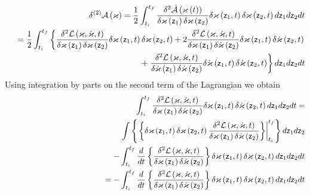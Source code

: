 \begin{eqnarray}
&&\delta ^{\left( 2\right) }{\cal A}\left( \varkappa \right) =\frac{1}{2}%
\int_{t_{i}}^{t_{f}}\frac{\delta ^{2}{\cal \dot{A}}\left( \varkappa \left(
t\right) \right) }{\delta \varkappa \left( {\sf z}_{1}\right) \delta
\varkappa \left( {\sf z}_{2}\right) }\delta \varkappa \left( {\sf z}%
_{1},t\right) \delta \varkappa \left( {\sf z}_{2},t\right) d{\sf z}_{1}d{\sf %
z}_{2}dt  \nonumber \\
&&\left. {}\right. =\frac{1}{2}\int_{t_{i}}^{t_{f}}\left\{ \frac{\delta ^{2}%
{\cal L}\left( {\cal \varkappa },{\cal \dot{\varkappa}},t\right) }{\delta
\varkappa \left( {\sf z}_{1}\right) \delta \varkappa \left( {\sf z}%
_{2}\right) }\delta \varkappa \left( {\sf z}_{1},t\right) \delta \varkappa
\left( {\sf z}_{2},t\right) +2\frac{\delta ^{2}{\cal L}\left( {\cal %
\varkappa },{\cal \dot{\varkappa}},t\right) }{\delta \varkappa \left( {\sf z}%
_{1}\right) \delta \dot{\varkappa}\left( {\sf z}_{2}\right) }\delta
\varkappa \left( {\sf z}_{1},t\right) \delta \dot{\varkappa}\left( {\sf z}%
_{2},t\right) \right.  \nonumber \\
&&\qquad \qquad \qquad \qquad \qquad \qquad \qquad +\left. \frac{\delta ^{2}%
{\cal L}\left( {\cal \varkappa },{\cal \dot{\varkappa}},t\right) }{\delta 
\dot{\varkappa}\left( {\sf z}_{1}\right) \delta \dot{\varkappa}\left( {\sf z}%
_{2}\right) }\delta \dot{\varkappa}\left( {\sf z}_{1},t\right) \delta \dot{%
\varkappa}\left( {\sf z}_{2},t\right) \right\} d{\sf z}_{1}d{\sf z}_{2}dt
\label{Avar2}
\end{eqnarray}%
Using integration by parts on the second term of the Lagrangian we obtain 
\begin{eqnarray}
&&\int_{t_{i}}^{t_{f}}\frac{\delta ^{2}{\cal L}\left( {\cal \varkappa },%
{\cal \dot{\varkappa}},t\right) }{\delta \varkappa \left( {\sf z}_{1}\right)
\delta \dot{\varkappa}\left( {\sf z}_{2}\right) }\delta \varkappa \left( 
{\sf z}_{1},t\right) \delta \dot{\varkappa}\left( {\sf z}_{2},t\right) d{\sf %
z}_{1}d{\sf z}_{2}dt=  \nonumber \\
&&\int \left\{ \left. \left\{ \delta \varkappa \left( {\sf z}_{1},t\right)
\delta \varkappa \left( {\sf z}_{2},t\right) \frac{\delta ^{2}{\cal L}\left(
\varkappa ,\dot{\varkappa},t\right) }{\delta \varkappa \left( {\sf z}%
_{1}\right) \delta \dot{\varkappa}\left( {\sf z}_{2}\right) }\right\}
\right| _{t_{i}}^{t_{f}}\right\} d{\sf z}_{1}d{\sf z}_{2}  \nonumber \\
&&\qquad \qquad \qquad \qquad \qquad -\int_{t_{i}}^{t_{f}}\frac{d}{dt}%
\left\{ \frac{\delta ^{2}{\cal L}\left( \varkappa ,\dot{\varkappa},t\right) 
}{\delta \varkappa \left( {\sf z}_{1}\right) \delta \dot{\varkappa}\left( 
{\sf z}_{2}\right) }\right\} \delta \varkappa \left( {\sf z}_{1},t\right)
\delta \varkappa \left( {\sf z}_{2},t\right) d{\sf z}_{1}d{\sf z}_{2}dt 
\nonumber \\
&&\left. {}\right. \qquad \qquad \qquad \qquad \qquad \quad
=-\int_{t_{i}}^{t_{f}}\frac{d}{dt}\left\{ \frac{\delta ^{2}{\cal L}\left(
\varkappa ,\dot{\varkappa},t\right) }{\delta \varkappa \left( {\sf z}%
_{1}\right) \delta \dot{\varkappa}\left( {\sf z}_{2}\right) }\right\} \delta
\varkappa \left( {\sf z}_{1},t\right) \delta \varkappa \left( {\sf z}%
_{2},t\right) d{\sf z}_{1}d{\sf z}_{2}dt
\end{eqnarray}%
